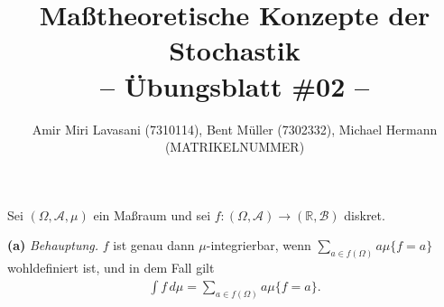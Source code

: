\documentclass[10pt]{article}
\newcommand{\R}{\mathbb{R}}
\newcommand{\beh}{\textit{Behauptung. }}
\newenvironment{Aufgabe}[2][Aufgabe]{\begin{trivlist}
\item[\hskip \labelsep {\bfseries #1}\hskip \labelsep {\bfseries #2.}]}{\end{trivlist}}
\begin{document}
 
\title{ \textbf{Maßtheoretische Konzepte der Stochastik \\ -- Übungsblatt \#02 --} }

\author{Amir Miri Lavasani (7310114), Bent Müller (7302332),
        Michael Hermann (MATRIKELNUMMER)} \maketitle

 
\begin{Aufgabe}{2}
    Sei $(\Omega,\mathcal{A},\mu)$ ein Maßraum und sei $f: (\Omega,\mathcal{A})\to (\R , \mathcal{B})$
    diskret. 
\end{Aufgabe}

\textbf{(a)} \beh $f$ ist genau dann $\mu$-integrierbar, wenn $\sum_{a\in f(\Omega)} a\mu\{f=a\}$ 
wohldefiniert ist, und in dem Fall gilt 
  \begin{align*}
    \int f \,d\mu = \sum_{a\in f(\Omega)} a\mu\{f=a\}.
  \end{align*}
\end{document}
